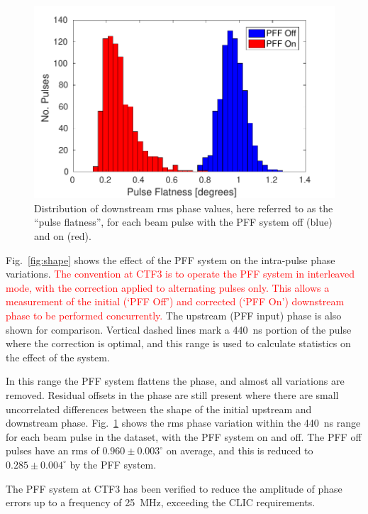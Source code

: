 \documentclass[%
 reprint,
superscriptaddress,
 amsmath,amssymb,
 prl,
]{revtex4-1}
\begin{document}
\begin{figure}
	\includegraphics[width=\columnwidth]{figs/flatness}%
	\caption{\label{fig:flatness}Distribution of downstream rms phase values, 
		here 
		referred to as the 
		``pulse flatness'', for each beam pulse with the PFF system off (blue) 
		and 
		on (red).}
\end{figure}

Fig.~\ref{fig:shape} shows the effect of the PFF system on the intra-pulse 
phase variations. \textcolor{red}{The convention at CTF3 is to operate the PFF 
system in 
interleaved mode, with 
the correction applied to alternating pulses only. This allows a measurement of 
the initial (`PFF Off') and corrected (`PFF On') downstream phase to be 
performed concurrently.} The upstream (PFF input) phase is also shown for 
comparison. Vertical dashed lines mark a 440~ns portion of the pulse where the 
correction is optimal, and this range is used to calculate statistics on the 
effect of the system. 

In this range the PFF system flattens the phase, 
and almost all variations are removed. Residual offsets in the phase are still 
present where there are small uncorrelated differences between the shape of the 
initial upstream and downstream phase. Fig.~\ref{fig:flatness} shows the rms 
phase variation within the 440~ns range 
for each beam pulse in the dataset, with the PFF system on and off. The PFF off 
pulses have an rms of \(0.960\pm0.003^\circ\) on average, and this is reduced 
to \(0.285\pm0.004^\circ\) by the PFF system.

The PFF system at CTF3 has been verified to reduce the amplitude of 
phase errors up to a frequency of 25~MHz, exceeding the CLIC requirements.
\end{document}
